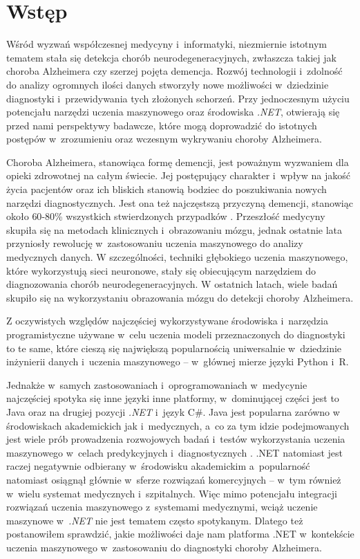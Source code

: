 \chapter*{Wstęp}

Wśród wyzwań współczesnej medycyny i~informatyki, niezmiernie istotnym tematem stała się detekcja chorób neurodegeneracyjnych, zwłaszcza takiej jak choroba Alzheimera czy szerzej pojęta demencja.
Rozwój technologii i~zdolność do analizy ogromnych ilości danych stworzyły nowe możliwości w~dziedzinie diagnostyki i~przewidywania tych złożonych schorzeń.
Przy jednoczesnym użyciu potencjału narzędzi uczenia maszynowego oraz środowiska \emph{.NET}, otwierają się przed nami perspektywy badawcze, które mogą doprowadzić do istotnych postępów w~zrozumieniu oraz wczesnym wykrywaniu choroby Alzheimera.

Choroba Alzheimera, stanowiąca formę demencji, jest poważnym wyzwaniem dla opieki zdrowotnej na całym świecie.
Jej postępujący charakter i~wpływ na jakość życia pacjentów oraz ich bliskich stanowią bodziec do poszukiwania nowych narzędzi diagnostycznych.
Jest ona też najczęstszą przyczyną demencji, stanowiąc około $60$-$80$\% wszystkich stwierdzonych przypadków \cite{what-is-alzheimers:2023}.
Przeszłość medycyny skupiła się na metodach klinicznych i~obrazowaniu mózgu, jednak ostatnie lata przyniosły rewolucję w~zastosowaniu uczenia maszynowego do analizy medycznych danych.
W szczególności, techniki głębokiego uczenia maszynowego, które wykorzystują sieci neuronowe, stały się obiecującym narzędziem do diagnozowania chorób neurodegeneracyjnych.
W ostatnich latach, wiele badań skupiło się na wykorzystaniu obrazowania mózgu do detekcji choroby Alzheimera.

Z oczywistych względów najczęściej wykorzystywane środowiska i~narzędzia programistyczne używane w~celu uczenia modeli przeznaczonych do diagnostyki to te same, które cieszą się największą popularnością uniwersalnie w~dziedzinie inżynierii danych i~uczenia maszynowego -- w~głównej mierze języki Python i~R.

Jednakże w~samych zastosowaniach i~oprogramowaniach w~medycynie najczęściej spotyka się inne języki inne platformy, w~dominującej części jest to Java oraz na drugiej pozycji \emph{.NET} i~język C\#.
Java jest popularna zarówno w środowiskach akademickich jak i~medycznych, a~co za tym idzie podejmowanych jest wiele prób prowadzenia rozwojowych badań i~testów wykorzystania uczenia maszynowego w~celach predykcyjnych i~diagnostycznych \cite{soman2005classification, nithya2017predictive, gobbel2014development, godara2016evaluation}.
.NET natomiast jest raczej negatywnie odbierany w~środowisku akademickim a~popularność natomiast osiągnął głównie w~sferze rozwiązań komercyjnych -- w~tym również w~wielu systemat medycznych i~szpitalnych.
Więc mimo potencjału integracji rozwiązań uczenia maszynowego z~systemami medycznymi, wciąż uczenie maszynowe w~\emph{.NET} nie jest tematem często spotykanym.
Dlatego też postanowiłem sprawdzić, jakie możliwości daje nam platforma .NET w~kontekście uczenia maszynowego w~zastosowaniu do diagnostyki choroby Alzheimera.

